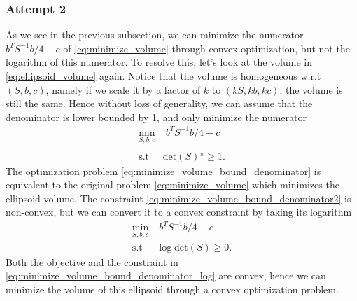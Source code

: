 \documentclass{article}
\begin{document}
\subsubsection{Attempt 2}
As we see in the previous subsection, we can minimize the numerator $b^TS^{-1}b/4-c$ of \eqref{eq:minimize_volume} through convex optimization, but not the logarithm of this numerator. To resolve this, let's look at the volume in \eqref{eq:ellipsoid_volume} again. Notice that the volume is homogeneous w.r.t $(S, b, c)$, namely if we scale it by a factor of $k$ to $(kS, kb, kc)$, the volume is still the same. Hence without loss of generality, we can assume that the denominator is lower bounded by 1, and only minimize the numerator
\begin{subequations}
\begin{align}
	\min_{S, b, c}&\; b^TS^{-1}b/4-c\\
	\text{s.t }& \text{det}(S)^{\frac{1}{n}}\ge 1. \label{eq:minimize_volume_bound_denominator2}
\end{align}
\label{eq:minimize_volume_bound_denominator}
\end{subequations}
The optimization problem \eqref{eq:minimize_volume_bound_denominator} is equivalent to the original problem \eqref{eq:minimize_volume} which minimizes the ellipsoid volume. The constraint \eqref{eq:minimize_volume_bound_denominator2} is non-convex, but we can convert it to a convex constraint by taking its logarithm
\begin{subequations}
\begin{align}
	\min_{S, b, c}&\; b^TS^{-1}b/4-c\\
	\text{s.t }& \log\text{det}(S)\ge 0. 
\end{align}
\label{eq:minimize_volume_bound_denominator_log}
\end{subequations}
Both the objective and the constraint in \eqref{eq:minimize_volume_bound_denominator_log} are convex, hence we can minimize the volume of this ellipsoid through a convex optimization problem.
\end{document}
